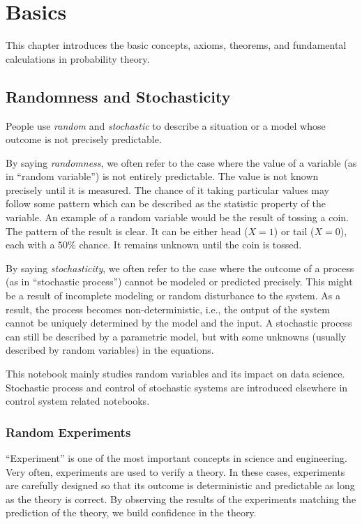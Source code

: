 \chapter{Basics} \label{ch:pbbasics}

This chapter introduces the basic concepts, axioms, theorems, and fundamental calculations in probability theory.

\section{Randomness and Stochasticity}

People use \textit{random} and \textit{stochastic} to describe a situation or a model whose outcome is not precisely predictable.

By saying \textit{randomness}, we often refer to the case where the value of a variable (as in ``random variable'') is not entirely predictable. The value is not known precisely until it is measured. The chance of it taking particular values may follow some pattern which can be described as the statistic property of the variable. An example of a random variable would be the result of tossing a coin. The pattern of the result is clear. It can be either head ($X=1$) or tail ($X=0$), each with a $50\%$ chance. It remains unknown until the coin is tossed.

By saying \textit{stochasticity}, we often refer to the case where the outcome of a process (as in ``stochastic process'') cannot be modeled or predicted precisely. This might be a result of incomplete modeling or random disturbance to the system. As a result, the process becomes non-deterministic, i.e., the output of the system cannot be uniquely determined by the model and the input. A stochastic process can still be described by a parametric model, but with some unknowns (usually described by random variables) in the equations.

This notebook mainly studies random variables and its impact on data science. Stochastic process and control of stochastic systems are introduced elsewhere in control system related notebooks.

\subsection{Random Experiments}

``Experiment'' is one of the most important concepts in science and engineering. Very often, experiments are used to verify a theory. In these cases, experiments are carefully designed so that its outcome is deterministic and predictable as long as the theory is correct. By observing the results of the experiments matching the prediction of the theory, we build confidence in the theory.

